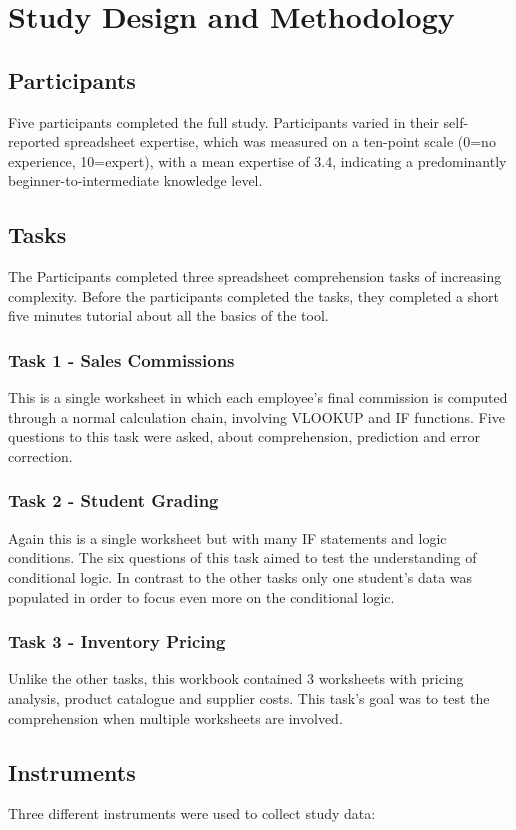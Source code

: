 \section{Study Design and Methodology}
\subsection{Participants}
Five participants completed the full study. Participants varied in their self-reported spreadsheet expertise, which was measured on a ten-point scale (0=no experience, 10=expert), with a mean expertise of 3.4, indicating a predominantly beginner-to-intermediate knowledge level.
\subsection{Tasks}
The Participants completed three spreadsheet comprehension tasks of increasing complexity. Before the participants completed the tasks, they completed a short five minutes tutorial about all the basics of the tool.
\subsubsection{Task 1 - Sales Commissions}
This is a single worksheet in which each employee's final commission is computed through a normal calculation chain, involving VLOOKUP and IF functions. Five questions to this task were asked, about comprehension, prediction and error correction.
\subsubsection{Task 2 - Student Grading}
Again this is a single worksheet but with many IF statements and logic conditions. The six questions of this task aimed to test the understanding of conditional logic. In contrast to the other tasks only one student's data was populated in order to focus even more on the conditional logic.
\subsubsection{Task 3 - Inventory Pricing}
Unlike the other tasks, this workbook contained 3 worksheets with pricing analysis, product catalogue and supplier costs. This task's goal was to test the comprehension when multiple worksheets are involved.

\subsection{Instruments}
Three different instruments were used to collect study data:
